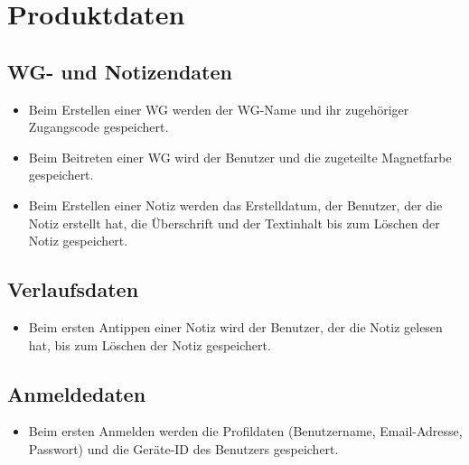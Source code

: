 \documentclass[a4paper]{scrreprt}
\begin{document}
    \chapter{Produktdaten}
        \section{WG- und Notizendaten}
        \begin{itemize}
        \item Beim Erstellen einer WG werden der WG-Name und ihr zugehöriger Zugangscode gespeichert.
		\item Beim Beitreten einer WG wird der Benutzer und die zugeteilte Magnetfarbe gespeichert.
		\item Beim Erstellen einer Notiz werden das Erstelldatum, der Benutzer, der die Notiz erstellt hat, die Überschrift und der Textinhalt bis zum Löschen der Notiz gespeichert.
        \end{itemize}
       
		\section{Verlaufsdaten}
		\begin{itemize}
		\item Beim ersten Antippen einer Notiz wird der Benutzer, der die Notiz gelesen hat, bis zum Löschen der Notiz gespeichert.
		\end{itemize}
        
        \section{Anmeldedaten}
        \begin{itemize}
        \item Beim ersten Anmelden werden die Profildaten (Benutzername, Email-Adresse, Passwort) und die Geräte-ID des Benutzers gespeichert.
        \end{itemize}
\end{document}
